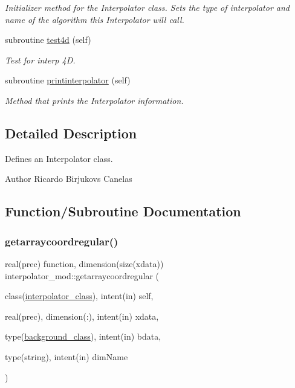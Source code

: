 \begin{DoxyCompactItemize}
\begin{DoxyCompactList}\small\item\em Initializer method for the Interpolator class. Sets the type of interpolator and name of the algorithm this Interpolator will call. \end{DoxyCompactList}\item 
subroutine \mbox{\hyperlink{namespaceinterpolator__mod_ac27ad06522b34071302dc09d10b0ec7e}{test4d}} (self)
\begin{DoxyCompactList}\small\item\em Test for interp 4D. \end{DoxyCompactList}\item 
subroutine \mbox{\hyperlink{namespaceinterpolator__mod_a9b149bc8a3da5d1864b8c049f8b00697}{printinterpolator}} (self)
\begin{DoxyCompactList}\small\item\em Method that prints the Interpolator information. \end{DoxyCompactList}\end{DoxyCompactItemize}


\subsection{Detailed Description}
Defines an Interpolator class. 

\begin{DoxyAuthor}{Author}
Ricardo Birjukovs Canelas 
\end{DoxyAuthor}


\subsection{Function/\+Subroutine Documentation}
\mbox{\label{namespaceinterpolator__mod_a6aca35ff7ad8ecb7c741c51f1863a30d}} 
\subsubsection{\texorpdfstring{getarraycoordregular()}{getarraycoordregular()}}
{\footnotesize\ttfamily real(prec) function, dimension(size(xdata)) interpolator\+\_\+mod\+::getarraycoordregular (\begin{DoxyParamCaption}\item[{class(\mbox{\hyperlink{structinterpolator__mod_1_1interpolator__class}{interpolator\+\_\+class}}), intent(in)}]{self,  }\item[{real(prec), dimension(\+:), intent(in)}]{xdata,  }\item[{type(\mbox{\hyperlink{structbackground__mod_1_1background__class}{background\+\_\+class}}), intent(in)}]{bdata,  }\item[{type(string), intent(in)}]{dim\+Name }\end{DoxyParamCaption})\hspace{0.3cm}{\ttfamily [private]}}




